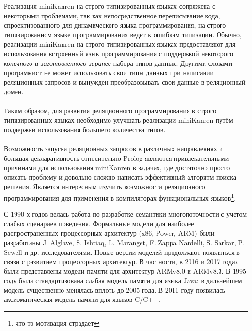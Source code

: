 Реализация miniKanren на строго типизированных языках сопряжена с некоторыми проблемами, так как непосредственное переписывание кода, спроектированного для динамического языка программирования, на строго типизированном языке программирования ведет к ошибкам типизации. Обычно, реализации miniKanren на строго типизированных языках предоставляют для использования встроенный язык программирования с поддержкой некоторого \emph{конечного и заготовленного заранее} набора типов данных. Другими словами программист не может использовать свои типы данных при написании реляционных запросов и вынужден преобразовывать свои данные в реляционный домен.

\paragraph{} Таким образом, для развития реляционного программирования в строго типизированных языках необходимо улучшать реализации miniKanren путём поддержки использования большего количества типов. 

\paragraph{} Возможность запуска реляционных запросов в различных направлениях и большая декларативность относительно Prolog являются привлекательными причинами для использования miniKanren в задачах, где достаточно просто описать проблему и довольно сложно написать эффективный алгоритм поиска решения. Является интересным изучить возможности реляционного программирования для применения в компиляторах функциональных языков\footnote{что-то мотивация страдает}.

{\progress}
С 1990-х годов велась работа по
разработке семантики многопоточности с учетом слабых сценариев поведения.
Формальные модели для наиболее распространенных процессорных архитектур (x86, Power, ARM)
были разработаны J. Alglave, S. Ishtiaq, L. Maranget, F. Zappa Nardelli, S. Sarkar, P. Sewell и др.
исследователями.
Новые версии моделей продолжают появляться в связи с развитием процессорных архитектур.
В частности, в 2016 и 2017 годах были представлены модели памяти для архитектур ARMv8.0 и
ARMv8.3.
В 1995 году была стандартизована слабая модель памяти для языка Java;
в дальнейшем модель существенно менялась вплоть до 2005 года.
В 2011 году появилась аксиоматическая модель памяти для языков C/C++.


